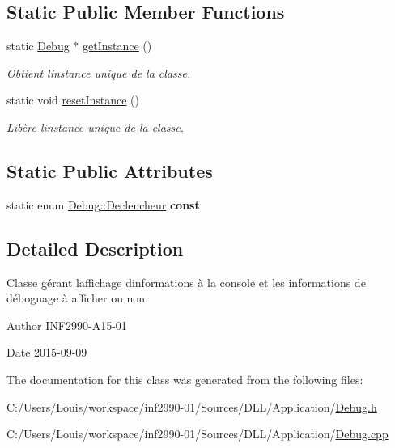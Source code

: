 \subsection*{Static Public Member Functions}
\begin{DoxyCompactItemize}
\item 
static \hyperlink{class_debug}{Debug} $\ast$ \hyperlink{group__inf2990_ga823bf701dd9f4c706143dca1e8666941}{get\+Instance} ()
\begin{DoxyCompactList}\small\item\em Obtient l\textquotesingle{}instance unique de la classe. \end{DoxyCompactList}\item 
static void \hyperlink{group__inf2990_gacaafb83305279aafab24735adc903931}{reset\+Instance} ()
\begin{DoxyCompactList}\small\item\em Libère l\textquotesingle{}instance unique de la classe. \end{DoxyCompactList}\end{DoxyCompactItemize}
\subsection*{Static Public Attributes}
\begin{DoxyCompactItemize}
\item 
\hypertarget{class_debug_a1d6c7b38caff29c900eebaef79e0adae}{}static enum \hyperlink{class_debug_afd6ed3c50c08d0a7830cd5253b4ab8b6}{Debug\+::\+Declencheur} {\bfseries const}\label{class_debug_a1d6c7b38caff29c900eebaef79e0adae}

\end{DoxyCompactItemize}


\subsection{Detailed Description}
Classe gérant l\textquotesingle{}affichage d\textquotesingle{}informations à la console et les informations de déboguage à afficher ou non. 

\begin{DoxyAuthor}{Author}
I\+N\+F2990-\/\+A15-\/01 
\end{DoxyAuthor}
\begin{DoxyDate}{Date}
2015-\/09-\/09 
\end{DoxyDate}


The documentation for this class was generated from the following files\+:\begin{DoxyCompactItemize}
\item 
C\+:/\+Users/\+Louis/workspace/inf2990-\/01/\+Sources/\+D\+L\+L/\+Application/\hyperlink{_debug_8h}{Debug.\+h}\item 
C\+:/\+Users/\+Louis/workspace/inf2990-\/01/\+Sources/\+D\+L\+L/\+Application/\hyperlink{_debug_8cpp}{Debug.\+cpp}\end{DoxyCompactItemize}
